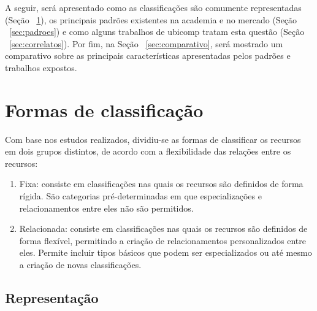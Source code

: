 A seguir, será apresentado como as classificações são comumente representadas (Seção ~\ref{sec:formasDeClass}), os principais padrões existentes na academia e no mercado (Seção ~\ref{sec:padroes}) e como alguns trabalhos de ubicomp tratam esta questão (Seção ~\ref{sec:correlatos}). Por fim, na Seção ~\ref{sec:comparativo}, será mostrado um comparativo sobre as principais características apresentadas pelos padrões e trabalhos expostos.

\section{Formas de classificação}
\label{sec:formasDeClass}

Com base nos estudos realizados, dividiu-se as formas de classificar os recursos em dois grupos distintos, de acordo com a flexibilidade das relações entre os recursos:

\begin{enumerate}
	\item Fixa: consiste em classificações nas quais os recursos são definidos de forma rígida. São categorias pré-determinadas em que especializações e relacionamentos entre eles não são permitidos.

	\item Relacionada: consiste em classificações nas quais os recursos são definidos de forma flexível, permitindo a criação de relacionamentos personalizados entre eles. Permite incluir tipos básicos que podem ser especializados ou até mesmo a criação de novas classificações.
\end{enumerate}

\subsection{Representação}

